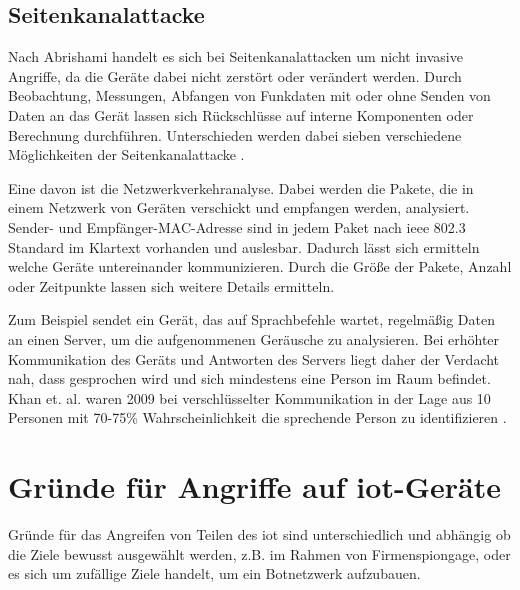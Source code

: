 \documentclass[12pt, a4paper, onecolumn, oneside, toc=bibliographynumbered, liststotoc]{scrreprt} %
\begin{document}
		\section{Seitenkanalattacke}
  Nach Abrishami handelt es sich bei Seitenkanalattacken um nicht invasive Angriffe, da die Geräte dabei nicht zerstört oder verändert werden. Durch Beobachtung, Messungen, Abfangen von Funkdaten mit oder ohne Senden von Daten an das Gerät lassen sich Rückschlüsse auf interne Komponenten oder Berechnung durchführen. Unterschieden werden dabei sieben verschiedene Möglichkeiten der Seitenkanalattacke \parencite{Abrishamchi.2017}.
  
  Eine davon ist die Netzwerkverkehranalyse. Dabei werden die Pakete, die in einem Netzwerk von Geräten verschickt und empfangen werden, analysiert. Sender- und Empfänger\hyphen MAC\hyphen Adresse sind in jedem Paket nach \ac{ieee} 802.3 Standard im Klartext vorhanden und auslesbar. Dadurch lässt sich ermitteln welche Geräte untereinander kommunizieren. Durch die Größe der Pakete, Anzahl oder Zeitpunkte lassen sich weitere Details ermitteln.
  
  Zum Beispiel sendet ein Gerät, das auf Sprachbefehle wartet, regelmäßig Daten an einen Server, um die aufgenommenen Geräusche zu analysieren. Bei erhöhter Kommunikation des Geräts und Antworten des Servers liegt daher der Verdacht nah, dass gesprochen wird und sich mindestens eine Person im Raum befindet. Khan et. al. waren 2009 bei verschlüsselter Kommunikation in der Lage aus 10 Personen mit 70-75\% Wahrscheinlichkeit die sprechende Person zu identifizieren \parencite[70]{Khan.2010}.
		
	\chapter{Gründe für Angriffe auf \ac{iot}-Geräte}
 Gründe für das Angreifen von Teilen des \ac{iot} sind unterschiedlich und abhängig ob die Ziele bewusst ausgewählt werden, z.B. im Rahmen von Firmenspiongage, oder es sich um zufällige Ziele handelt, um ein Botnetzwerk aufzubauen.
 
\end{document}

